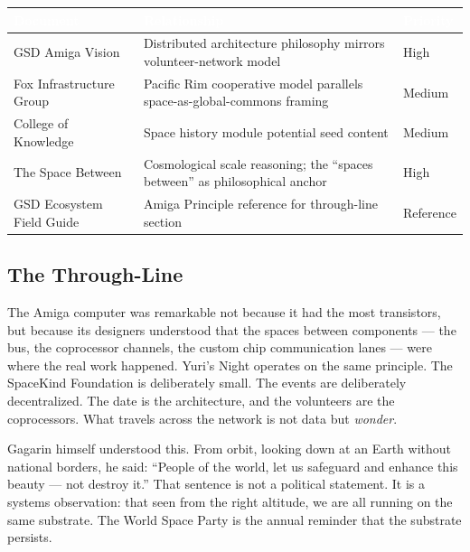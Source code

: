 \documentclass[11pt,letterpaper]{article}
\newcommand{\stageheader}[2]{%
  \noindent\colorbox{#2}{\makebox[\textwidth][l]{%
    \textcolor{white}{\bfseries\sffamily\hspace{6pt}#1\hspace{6pt}}}}%
  \vspace{0.5em}\par%
}
\newcommand{\tableheader}[1]{\textbf{\sffamily\textcolor{white}{#1}}}
\begin{document}
\begin{center}
\begin{tabularx}{\textwidth}{L{4cm}XC{2.5cm}}
\toprule
{}
\tableheader{Document} & \tableheader{Relationship} & \tableheader{Priority} \\
\midrule
GSD Amiga Vision & Distributed architecture philosophy mirrors volunteer-network model & High \\
Fox Infrastructure Group & Pacific Rim cooperative model parallels space-as-global-commons framing & Medium \\
College of Knowledge & Space history module potential seed content & Medium \\
The Space Between & Cosmological scale reasoning; the ``spaces between'' as philosophical anchor & High \\
GSD Ecosystem Field Guide & Amiga Principle reference for through-line section & Reference \\
\bottomrule
\end{tabularx}
\end{center}

\subsection{The Through-Line}

The Amiga computer was remarkable not because it had the most transistors, but because its designers understood that the spaces between components — the bus, the coprocessor channels, the custom chip communication lanes — were where the real work happened. Yuri's Night operates on the same principle. The SpaceKind Foundation is deliberately small. The events are deliberately decentralized. The date is the architecture, and the volunteers are the coprocessors. What travels across the network is not data but \emph{wonder}.

Gagarin himself understood this. From orbit, looking down at an Earth without national borders, he said: ``People of the world, let us safeguard and enhance this beauty — not destroy it.'' That sentence is not a political statement. It is a systems observation: that seen from the right altitude, we are all running on the same substrate. The World Space Party is the annual reminder that the substrate persists.

\newpage

\stageheader{STAGE 2 --- RESEARCH REFERENCE}{secondary}
\end{document}

